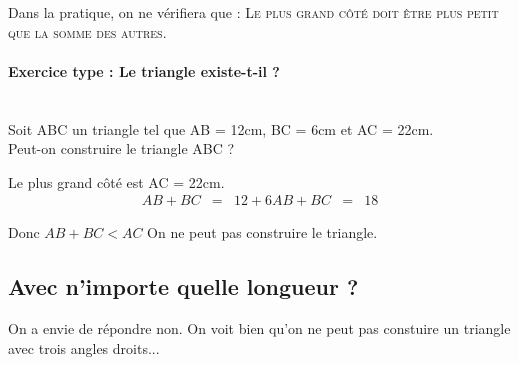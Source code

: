 \documentclass[11pt]{article}
\begin{document}
Dans la pratique, on ne vérifiera que : \textsc{Le plus grand côté doit être plus petit que la somme des autres.} 

\paragraph*{Exercice type : Le triangle existe-t-il ?}~~\\

Soit ABC un triangle tel que AB = 12cm, BC = 6cm et AC = 22cm. \\ 
Peut-on construire le triangle ABC ?

Le plus grand côté est AC = 22cm.
\begin{align*}
  AB + BC &=& 12 + 6
  AB + BC &=& 18
\end{align*}

Donc $AB + BC < AC$
On ne peut pas construire le triangle. 

\subsection*{Avec n'importe quelle longueur ?}

On a envie de répondre non. On voit bien qu'on ne peut pas constuire un triangle avec trois angles droits...
\end{document}
